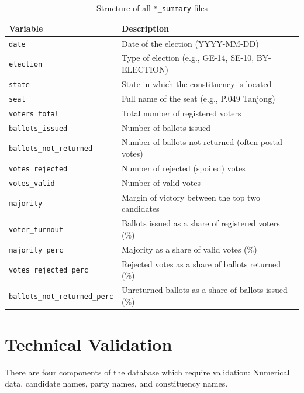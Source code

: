 \documentclass[11pt]{article}
\begin{document}
\begin{table}[ht]
	\def\arraystretch{1.3}
	\centering
	\caption{Structure of all \texttt{*\_summary} files}
	\label{tab:summary_structure}
	\vspace{0.14in}
	\begin{tabular}{L{0.35\linewidth}L{0.65\linewidth}}
	\toprule
	\textbf{Variable} & \textbf{Description} \\
	\midrule
	\texttt{date} & Date of the election (YYYY-MM-DD) \\
	\texttt{election} & Type of election (e.g., GE-14, SE-10, BY-ELECTION) \\
	\texttt{state} & State in which the constituency is located \\
	\texttt{seat} & Full name of the seat (e.g., P.049 Tanjong) \\
	\texttt{voters\_total} & Total number of registered voters \\
	\texttt{ballots\_issued} & Number of ballots issued \\
	\texttt{ballots\_not\_returned} & Number of ballots not returned (often postal votes) \\
	\texttt{votes\_rejected} & Number of rejected (spoiled) votes \\
	\texttt{votes\_valid} & Number of valid votes \\
	\texttt{majority} & Margin of victory between the top two candidates \\
	\texttt{voter\_turnout} & Ballots issued as a share of registered voters (\%) \\
	\texttt{majority\_perc} & Majority as a share of valid votes (\%) \\
	\texttt{votes\_rejected\_perc} & Rejected votes as a share of ballots returned (\%) \\
	\texttt{ballots\_not\_returned\_perc} & Unreturned ballots as a share of ballots issued (\%) \\
	\bottomrule
	\end{tabular}
\end{table}
	

\section*{Technical Validation}
There are four components of the database which require validation: Numerical data, candidate names, party names, and constituency names. 
\end{document}
